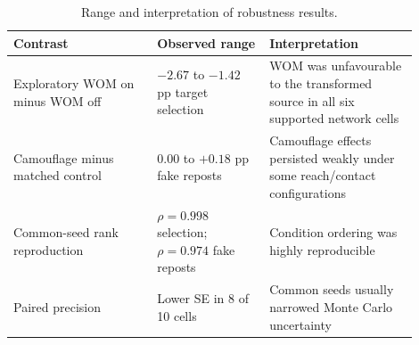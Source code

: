\begin{table}[tbp]
\centering
\caption{Range and interpretation of robustness results.}
\label{tab:robustness}
\begin{tabular}{p{0.32\linewidth}p{0.25\linewidth}p{0.33\linewidth}}
\toprule
Contrast & Observed range & Interpretation \\
\midrule
Exploratory WOM on minus WOM off & $-2.67$ to $-1.42$ pp target selection & WOM was unfavourable to the transformed source in all six supported network cells \\
Camouflage minus matched control & $0.00$ to $+0.18$ pp fake reposts & Camouflage effects persisted weakly under some reach/contact configurations \\
Common-seed rank reproduction & $\rho=0.998$ selection; $\rho=0.974$ fake reposts & Condition ordering was highly reproducible \\
Paired precision & Lower SE in 8 of 10 cells & Common seeds usually narrowed Monte Carlo uncertainty \\
\bottomrule
\end{tabular}
\end{table}
